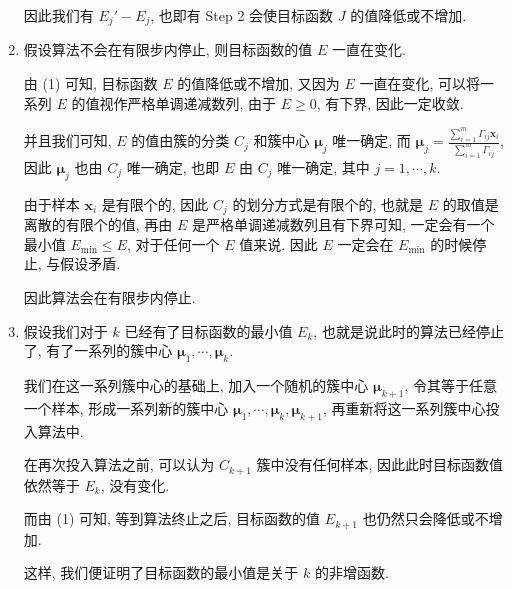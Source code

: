 \documentclass[answers]{exam}  %
\begin{document}
\begin{questions}
\begin{solution}
\begin{enumerate}
            因此我们有 $E_j' - E_j$, 也即有 Step 2 会使目标函数 $J$ 的值降低或不增加.

      \item

            假设算法不会在有限步内停止, 则目标函数的值 $E$ 一直在变化.

            由 (1) 可知, 目标函数 $E$ 的值降低或不增加, 又因为 $E$ 一直在变化, 可以将一系列 $E$ 的值视作严格单调递减数列, 由于 $E \ge 0$, 有下界, 因此一定收敛.

            并且我们可知, $E$ 的值由簇的分类 $C_j$ 和簇中心 $\bm{\mu}_j$ 唯一确定, 而 $\displaystyle \bm{\mu}_j = \frac{\sum_{i=1}^{m}\Gamma_{ij}\bm{x}_{i}}{\sum_{i=1}^{m}\Gamma_{ij}}$, 因此 $\bm{\mu}_j$ 也由 $C_j$ 唯一确定, 也即 $E$ 由 $C_j$ 唯一确定, 其中 $j = 1, \cdots, k$.

            由于样本 $\bm{x}_i$ 是有限个的, 因此 $C_j$ 的划分方式是有限个的, 也就是 $E$ 的取值是离散的有限个的值, 再由 $E$ 是严格单调递减数列且有下界可知, 一定会有一个最小值 $E_{\min} \le E$, 对于任何一个 $E$ 值来说. 因此 $E$ 一定会在 $E_{\min}$ 的时候停止, 与假设矛盾.

            因此算法会在有限步内停止.

      \item

            假设我们对于 $k$ 已经有了目标函数的最小值 $E_{k}$, 也就是说此时的算法已经停止了, 有了一系列的簇中心 $\bm{\mu}_1, \cdots, \bm{\mu}_k$.

            我们在这一系列簇中心的基础上, 加入一个随机的簇中心 $\bm{\mu}_{k+1}$, 令其等于任意一个样本, 形成一系列新的簇中心 $\bm{\mu}_1, \cdots, \bm{\mu}_k, \bm{\mu}_{k+1}$, 再重新将这一系列簇中心投入算法中.

            在再次投入算法之前, 可以认为 $C_{k+1}$ 簇中没有任何样本, 因此此时目标函数值依然等于 $E_{k}$, 没有变化.

            而由 (1) 可知, 等到算法终止之后, 目标函数的值 $E_{k+1}$ 也仍然只会降低或不增加.

            这样, 我们便证明了目标函数的最小值是关于 $k$ 的非增函数.
    \end{enumerate}
  \end{solution}

\end{questions}
\end{document}
